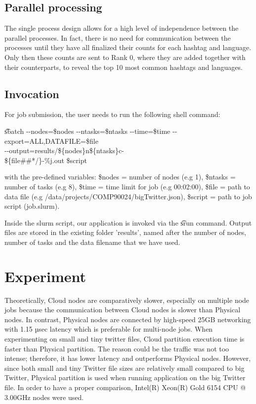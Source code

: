 \documentclass[11pt]{article}
\begin{document}
\subsection{Parallel processing}
The single process design allows for a high level of independence between the parallel processes. In fact, there is no need for communication between the processes until they have all finalized their counts for each hashtag and language. Only then these counts are sent to Rank 0, where they are added together with their counterparts, to reveal the top 10 most common hashtags and languages.

\subsection{Invocation}

For job submission, the user needs to run the following shell command:
\begin{flushleft}
\t sbatch {-}-nodes=\$nodes {-}-ntasks=\$ntasks {-}-time=\$time {-}-export=ALL,DATAFILE=\$file\\ {-}-output=results/\$\{nodes\}n\$\{ntasks\}c-\\\$\{file\#\#*/\}-\%j.out \$script
\end{flushleft}
with the pre-defined variables: \$nodes = number of nodes (e.g 1), \$ntasks = number of tasks (e.g 8), \$time = time limit for job (e.g 00:02:00), \$file = path to data file (e.g /data/projects/COMP90024/bigTwitter.json), \$script = path to job script (job.slurm).

Inside the slurm script, our application is invoked via the \t srun command. Output files are stored in the existing folder 'results', named after the number of nodes, number of tasks and the data filename that we have used.

\section{Experiment}

Theoretically, Cloud nodes are comparatively slower, especially on multiple node jobs because the communication between Cloud nodes is slower than Physical nodes. In contrast, Physical nodes are connected by high-speed 25GB networking with 1.15 µsec latency which is preferable for multi-node jobs. When experimenting on small and tiny twitter files, Cloud partition execution time is faster than Physical partition. The reason could be the traffic was not too intense; therefore, it has lower latency and outperforms Physical nodes.  However, since both small and tiny Twitter file sizes are relatively small compared to big Twitter, Physical partition is used when running application on the big Twitter file. In order to have a proper comparison, Intel(R) Xeon(R) Gold 6154 CPU @ 3.00GHz nodes were used.
\end{document}
